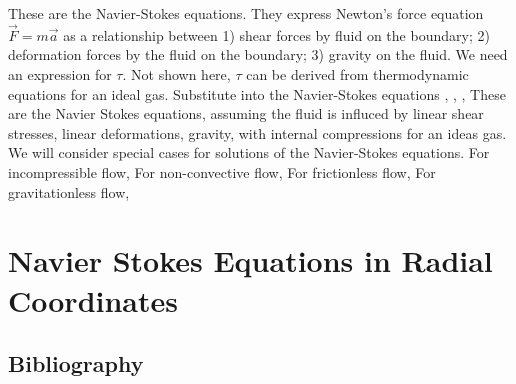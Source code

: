 \documentclass{article}
\begin{document}
These are the Navier-Stokes equations. They express Newton's force equation $\vec{F}=m\vec{a}$ as a relationship between 1) shear forces by fluid on the boundary; 2) deformation forces by the fluid on the boundary; 3) gravity on the fluid. We need an expression for $\tau$. Not shown here, $\tau$ can be derived from thermodynamic equations for an ideal gas.
Substitute into the Navier-Stokes equations , , ,
These are the Navier Stokes equations, assuming the fluid is influced by linear shear stresses, linear deformations, gravity, with internal compressions for an ideas gas. We will consider special cases for solutions of the Navier-Stokes equations. For incompressible flow,
For non-convective flow,
For frictionless flow,
For gravitationless flow,
\section{Navier Stokes Equations in Radial Coordinates}
\subsection{Bibliography}
\end{document}
